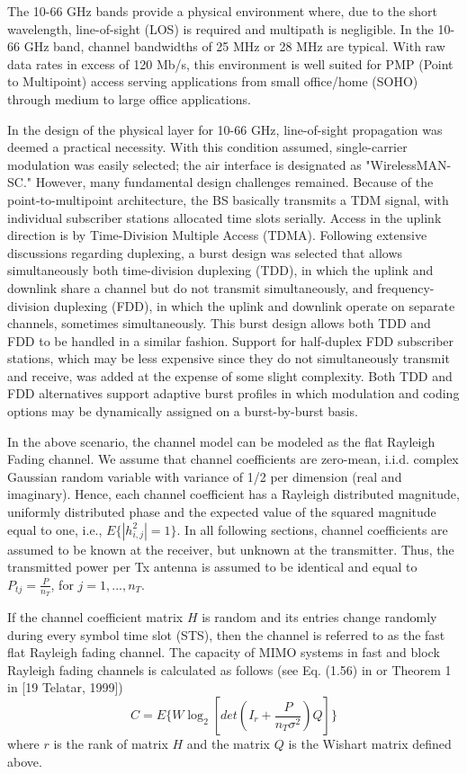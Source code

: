 The 10-66 GHz bands provide a physical environment where, due to the
short wavelength, line-of-sight (LOS) is required and multipath is
negligible. In the 10-66 GHz band, channel bandwidths of 25 MHz or
28 MHz are typical. With raw data rates in excess of 120 Mb/s, this
environment is well suited for PMP (Point to Multipoint) access
serving applications from small office/home (SOHO) through medium to
large office applications.

In the design of the physical layer for 10-66 GHz, line-of-sight
propagation was deemed a practical necessity. With this condition
assumed, single-carrier modulation was easily selected; the air
interface is designated as "WirelessMAN-SC." However, many
fundamental design challenges remained. Because of the
point-to-multipoint architecture, the BS basically transmits a TDM
signal, with individual subscriber stations allocated time slots
serially. Access in the uplink direction is by Time-Division
Multiple Access (TDMA). Following extensive discussions regarding
duplexing, a burst design was selected that allows simultaneously
both time-division duplexing (TDD), in which the uplink and downlink
share a channel but do not transmit simultaneously, and
frequency-division duplexing (FDD), in which the uplink and downlink
operate on separate channels, sometimes simultaneously. This burst
design allows both TDD and FDD to be handled in a similar fashion.
Support for half-duplex FDD subscriber stations, which may be less
expensive since they do not simultaneously transmit and receive, was
added at the expense of some slight complexity. Both TDD and FDD
alternatives support adaptive burst profiles in which modulation and
coding options may be dynamically assigned on a burst-by-burst
basis.

In the above scenario, the channel model can be modeled as the flat
Rayleigh Fading channel. We assume that channel coefficients are
zero-mean, i.i.d. complex Gaussian random variable with variance of
1/2 per dimension (real and imaginary).  Hence, each channel
coefficient has a Rayleigh distributed magnitude, uniformly
distributed phase and the expected value of the squared magnitude
equal to one, i.e., $E\{|h_{i,j}^{2}|=1\}$. In all following
sections, channel coefficients are assumed to be known at the
receiver, but unknown at the transmitter. Thus, the transmitted
power per Tx antenna is assumed to be identical and equal to
$P_{tj}=\frac{P}{n_{T}}$, for $j=1,...,n_{T}$.

If the channel coefficient matrix $H$ is random and its entries
change randomly during every symbol time slot (STS), then the
channel is referred to as the fast flat Rayleigh fading channel. The
capacity of MIMO systems in fast and block Rayleigh fading channels
is calculated as follows (see Eq. (1.56) in \cite{13} or Theorem 1
in [19 Telatar, 1999])
\begin{equation}
C=E\{W\log_{2}[det(I_{r}+\frac{P}{n_{T}\sigma^{2}})Q]\}
\end{equation}
where $r$ is the rank of matrix $H$ and the matrix $Q$ is the
Wishart matrix defined above.

